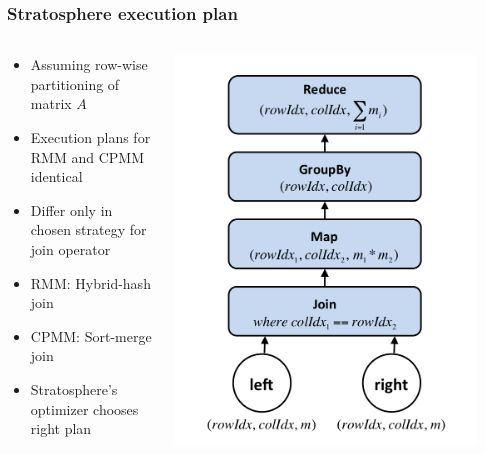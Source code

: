 \begin{frame}
	\frametitle{Stratosphere execution plan}
	\begin{columns}
		\begin{column}{0.5\textwidth}
			\begin{itemize}
				\item Assuming row-wise partitioning of matrix $A$
				\item Execution plans for RMM and CPMM identical
				\item Differ only in chosen strategy for join operator
				\item RMM: Hybrid-hash join
				\item CPMM: Sort-merge join
				\item Stratosphere's optimizer chooses right plan
			\end{itemize}
		\end{column}
		\begin{column}{0.5\textwidth}
			\includegraphics[width=0.9\textwidth]{images/matrixMult.png}
		\end{column}
	\end{columns}
\end{frame}